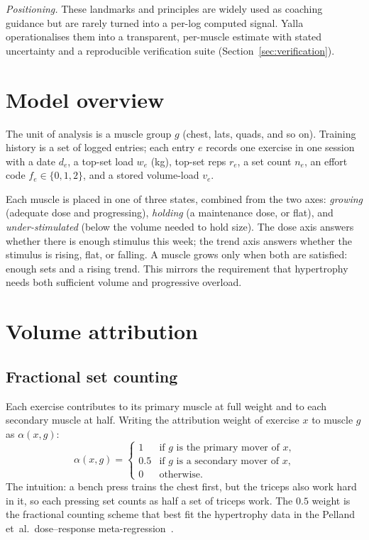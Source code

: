 \documentclass[11pt,a4paper]{article}
\begin{document}
\emph{Positioning.} These landmarks and principles are widely used as coaching guidance but are rarely turned into a per-log computed signal. Yalla operationalises them into a transparent, per-muscle estimate with stated uncertainty and a reproducible verification suite (Section~\ref{sec:verification}).

\section{Model overview}\label{sec:overview}
The unit of analysis is a muscle group $g$ (chest, lats, quads, and so on). Training history is a set of logged entries; each entry $e$ records one exercise in one session with a date $d_e$, a top-set load $w_e$ (kg), top-set reps $r_e$, a set count $n_e$, an effort code $f_e\in\{0,1,2\}$, and a stored volume-load $v_e$.

Each muscle is placed in one of three states, combined from the two axes: \emph{growing} (adequate dose and progressing), \emph{holding} (a maintenance dose, or flat), and \emph{under-stimulated} (below the volume needed to hold size). The dose axis answers whether there is enough stimulus this week; the trend axis answers whether the stimulus is rising, flat, or falling. A muscle grows only when both are satisfied: enough sets and a rising trend. This mirrors the requirement that hypertrophy needs both sufficient volume and progressive overload.

\section{Volume attribution}
\subsection{Fractional set counting}
Each exercise contributes to its primary muscle at full weight and to each secondary muscle at half. Writing the attribution weight of exercise $x$ to muscle $g$ as $\alpha(x,g)$:
\begin{equation}\label{eq:alpha}
\alpha(x,g)=
\begin{cases}
1 & \text{if $g$ is the primary mover of $x$,}\\
0.5 & \text{if $g$ is a secondary mover of $x$,}\\
0 & \text{otherwise.}
\end{cases}
\end{equation}
The intuition: a bench press trains the chest first, but the triceps also work hard in it, so each pressing set counts as half a set of triceps work. The $0.5$ weight is the fractional counting scheme that best fit the hypertrophy data in the Pelland et~al.\ dose--response meta-regression~\cite{drr}.
\end{document}
